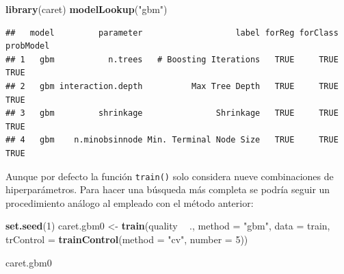 \documentclass[
  spanish,
]{book}
\newenvironment{Shaded}{\begin{snugshade}}{\end{snugshade}}
\newcommand{\DataTypeTok}[1]{\textcolor[rgb]{0.13,0.29,0.53}{#1}}
\newcommand{\DecValTok}[1]{\textcolor[rgb]{0.00,0.00,0.81}{#1}}
\newcommand{\KeywordTok}[1]{\textcolor[rgb]{0.13,0.29,0.53}{\textbf{#1}}}
\newcommand{\NormalTok}[1]{#1}
\newcommand{\OperatorTok}[1]{\textcolor[rgb]{0.81,0.36,0.00}{\textbf{#1}}}
\newcommand{\StringTok}[1]{\textcolor[rgb]{0.31,0.60,0.02}{#1}}
\theoremstyle{break}
\theoremstyle{definition}
\theoremstyle{definition}
\theoremstyle{definition}
\theoremstyle{remark}
\begin{document}
\begin{Shaded}
\begin{Highlighting}[]
\KeywordTok{library}\NormalTok{(caret)}
\KeywordTok{modelLookup}\NormalTok{(}\StringTok{"gbm"}\NormalTok{)}
\end{Highlighting}
\end{Shaded}

\begin{verbatim}
##   model         parameter                   label forReg forClass probModel
## 1   gbm           n.trees   # Boosting Iterations   TRUE     TRUE      TRUE
## 2   gbm interaction.depth          Max Tree Depth   TRUE     TRUE      TRUE
## 3   gbm         shrinkage               Shrinkage   TRUE     TRUE      TRUE
## 4   gbm    n.minobsinnode Min. Terminal Node Size   TRUE     TRUE      TRUE
\end{verbatim}

Aunque por defecto la función \texttt{train()} solo considera nueve combinaciones de hiperparámetros. Para hacer una búsqueda más completa se podría seguir un procedimiento análogo al empleado con el método anterior:

\begin{Shaded}
\begin{Highlighting}[]
\KeywordTok{set.seed}\NormalTok{(}\DecValTok{1}\NormalTok{)}
\NormalTok{caret.gbm0 <-}\StringTok{ }\KeywordTok{train}\NormalTok{(quality }\OperatorTok{~}\StringTok{ }\NormalTok{., }\DataTypeTok{method =} \StringTok{"gbm"}\NormalTok{, }\DataTypeTok{data =}\NormalTok{ train,}
                   \DataTypeTok{trControl =} \KeywordTok{trainControl}\NormalTok{(}\DataTypeTok{method =} \StringTok{"cv"}\NormalTok{, }\DataTypeTok{number =} \DecValTok{5}\NormalTok{))}
\end{Highlighting}
\end{Shaded}

\begin{Shaded}
\begin{Highlighting}[]
\NormalTok{caret.gbm0}
\end{Highlighting}
\end{Shaded}
\end{document}
